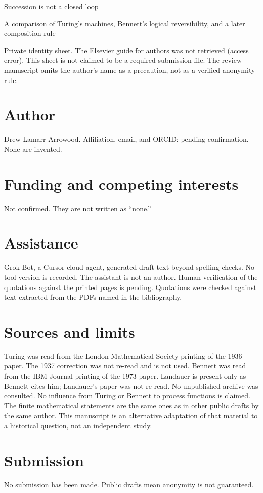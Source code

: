 \documentclass[12pt]{article}
\begin{document}
\begin{center}
{\Large Succession is not a closed loop\par}
\vspace{0.6em}
{\large A comparison of Turing's machines, Bennett's logical reversibility, and a later composition rule\par}
\vspace{1em}
Private identity sheet. The Elsevier guide for authors was not retrieved (access error). This sheet is not claimed to be a required submission file. The review manuscript omits the author's name as a precaution, not as a verified anonymity rule.\par
\end{center}
\section*{Author}
Drew Lamarr Arrowood. Affiliation, email, and ORCID: pending confirmation. None are invented.

\section*{Funding and competing interests}
Not confirmed. They are not written as ``none.''

\section*{Assistance}
Grok Bot, a Cursor cloud agent, generated draft text beyond spelling checks. No tool version is recorded. The assistant is not an author. Human verification of the quotations against the printed pages is pending. Quotations were checked against text extracted from the PDFs named in the bibliography.

\section*{Sources and limits}
Turing was read from the London Mathematical Society printing of the 1936 paper. The 1937 correction was not re-read and is not used. Bennett was read from the IBM Journal printing of the 1973 paper. Landauer is present only as Bennett cites him; Landauer's paper was not re-read. No unpublished archive was consulted. No influence from Turing or Bennett to process functions is claimed. The finite mathematical statements are the same ones as in other public drafts by the same author. This manuscript is an alternative adaptation of that material to a historical question, not an independent study.

\section*{Submission}
No submission has been made. Public drafts mean anonymity is not guaranteed.
\end{document}
